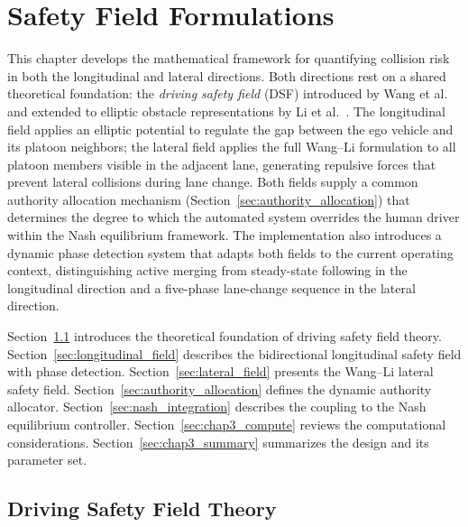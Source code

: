 \documentclass[12pt,a4paper,oneside]{report}
\begin{document}
\chapter{Safety Field Formulations}

This chapter develops the mathematical framework for quantifying collision risk in both the longitudinal and lateral directions. Both directions rest on a shared theoretical foundation: the \textit{driving safety field} (DSF) introduced by Wang et al.~\cite{wangDrivingSafetyField2015, wangDrivingSafetyField2016} and extended to elliptic obstacle representations by Li et al.~\cite{liSharedControlNovel2019}. The longitudinal field applies an elliptic potential to regulate the gap between the ego vehicle and its platoon neighbors; the lateral field applies the full Wang--Li formulation to all platoon members visible in the adjacent lane, generating repulsive forces that prevent lateral collisions during lane change. Both fields supply a common authority allocation mechanism (Section~\ref{sec:authority_allocation}) that determines the degree to which the automated system overrides the human driver within the Nash equilibrium framework. The implementation also introduces a dynamic phase detection system that adapts both fields to the current operating context, distinguishing active merging from steady-state following in the longitudinal direction and a five-phase lane-change sequence in the lateral direction.

Section~\ref{sec:dsf_theory} introduces the theoretical foundation of driving safety field theory. Section~\ref{sec:longitudinal_field} describes the bidirectional longitudinal safety field with phase detection. Section~\ref{sec:lateral_field} presents the Wang--Li lateral safety field. Section~\ref{sec:authority_allocation} defines the dynamic authority allocator. Section~\ref{sec:nash_integration} describes the coupling to the Nash equilibrium controller. Section~\ref{sec:chap3_compute} reviews the computational considerations. Section~\ref{sec:chap3_summary} summarizes the design and its parameter set.


\section{Driving Safety Field Theory}
\label{sec:dsf_theory}
\end{document}

